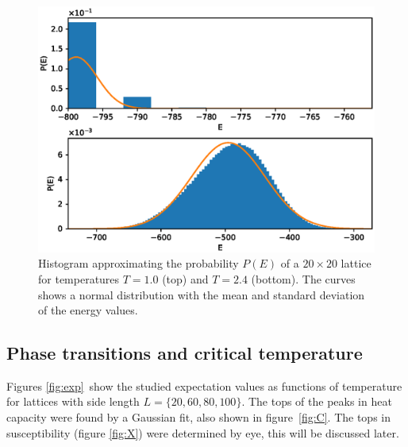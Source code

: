 \documentclass[a4paper,10pt,onecolumn]{article}
\begin{document}
\begin{figure}
	\centering
	\includegraphics[width=\linewidth]{hist.eps}
	\caption{Histogram approximating the probability $P(E)$ of a $20\times20$ lattice for temperatures $T=1.0$ (top) and $T=2.4$ (bottom). The curves shows a normal distribution with the mean and standard deviation of the energy values.}
	\label{fig:hist}
\end{figure}

\subsection{Phase transitions and critical temperature}	
Figures \ref{fig:exp} show the studied expectation values as functions of temperature for lattices with side length $L=\{20,60,80,100\}$. 
The tops of the peaks in heat capacity were found by a Gaussian fit, also shown in figure \ref{fig:C}. The tops in susceptibility (figure \ref{fig:X}) were determined by eye, this will be discussed later.
\end{document}
